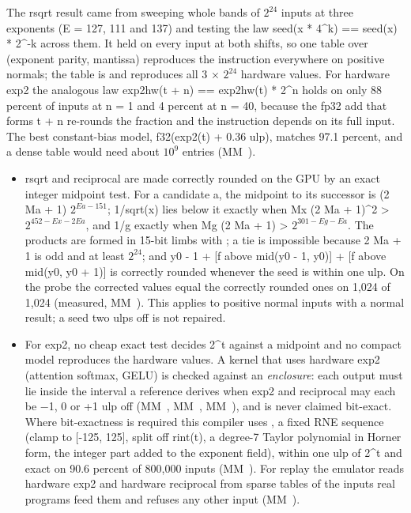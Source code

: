 The rsqrt result came from sweeping whole bands of $2^{24}$ inputs at three
exponents (E = 127, 111 and 137) and testing the law seed(x * 4\^{}k) == seed(x) * 2\^{}-k across them. It held on every input
at both shifts, so one table over (exponent parity, mantissa) reproduces the instruction everywhere on positive normals; the table
is  and reproduces all 3 × $2^{24}$ hardware values. For hardware exp2 the
analogous law exp2hw(t + n) == exp2hw(t) * 2\^{}n holds on only 88 percent of inputs at n = 1 and 4 percent at n = 40,
because the fp32 add that forms t + n re-rounds the fraction and the instruction depends on its full input. The best constant-bias model,
f32(exp2(t) + 0.36 ulp), matches 97.1 percent, and a dense table would need about $10^{9}$ entries (MM~).

\begin{itemize}
\item rsqrt and reciprocal are made correctly rounded on the GPU by an exact integer midpoint test. For a candidate a, the
  midpoint to its successor is (2 Ma + 1) $2^{Ea - 151}$; 1/sqrt(x) lies below it exactly when
  Mx (2 Ma + 1)\^{}2 > $2^{452 - Ex - 2 Ea}$, and 1/g exactly when Mg (2 Ma + 1) > $2^{301 - Eg - Ea}$. The products are formed in
  15-bit limbs with ; a tie is impossible because 2 Ma + 1 is odd and at least $2^{24}$; and
  y0 - 1 + {[}f above mid(y0 - 1, y0){]} + {[}f above mid(y0, y0 + 1){]} is correctly rounded whenever the seed is within one ulp.
  On the probe the corrected values equal the correctly rounded ones on 1,024 of 1,024 (measured, MM~). This
  applies to positive normal inputs with a normal result; a seed two ulps off is not repaired.
\item For exp2, no cheap exact test decides 2\^{}t against a midpoint and no compact model reproduces the hardware
  values. A kernel that uses hardware exp2 (attention softmax, GELU) is checked against an \emph{enclosure}: each output must
  lie inside the interval a reference derives when exp2 and reciprocal may each be −1, 0 or +1 ulp off (MM~,
  MM~, MM~), and is never claimed bit-exact. Where bit-exactness is required this compiler uses ,
  a fixed RNE sequence (clamp to {[}-125, 125{]}, split off rint(t), a degree-7 Taylor polynomial in Horner form, the integer
  part added to the exponent field), within one ulp of 2\^{}t and exact on 90.6 percent of 800,000 inputs (MM~). For
  replay the emulator reads hardware exp2 and hardware reciprocal from sparse tables of the inputs real programs feed them and refuses any
  other input (MM~).
\end{itemize}

